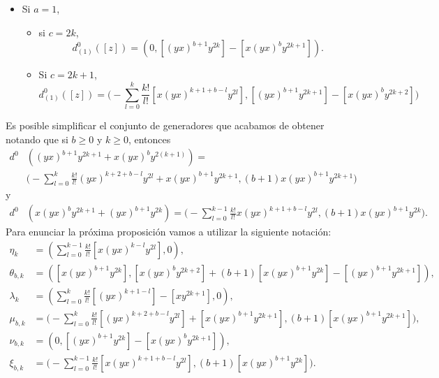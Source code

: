 \documentclass[fleqn,../tesis.tex]{subfiles}
\begin{document}
\begin{itemize}
\begin{itemize}
     \end{itemize}
     \item Si $a = 1$,
     \begin{itemize}
          \item si $c = 2k$,
          \[
               d^{0}_{(1)}([z]) = \left(0, \left[(yx)^{b + 1}y^{2k}\right] - \left[x(yx)^by^{2k + 1}\right] \right).          
          \]
          \item Si $c = 2k + 1$,
          \[
              d^{0}_{(1)}([z]) = \Bigg(-\sum_{l = 0}^{k}\frac{k!}{l!}\left[x(yx)^{k + 1 + b - l}y^{2l}\right],
                  \left[(yx)^{b + 1}y^{2k + 1}\right] - \left[x(yx)^{b}y^{2k + 2}\right]\Bigg)
          \]      
     \end{itemize}
\end{itemize}
Es posible simplificar el conjunto de generadores que acabamos de obtener notando que si $b \geq 0$ y $k \geq 0$, entonces
\begin{align*}
    d^{0}&\left((yx)^{b + 1}y^{2k + 1} + x(yx)^{b}y^{2(k + 1)}\right) = \\
    & \Bigg(-\sum_{l = 0}^{k}\frac{k!}{l!}(yx)^{k + 2 + b - l}y^{2l}
                    + x(yx)^{b + 1}y^{2k + 1}, (b + 1) x(yx)^{b + 1}y^{2k + 1}\Bigg)
\end{align*}
y
\begin{align*}
    d^{0}&\left(x(yx)^by^{2k + 1} + (yx)^{b + 1}y^{2k}\right) = \Bigg(-\sum_{l = 0}^{k - 1}\frac{k!}{l!}x(yx)^{k + 1 + b - l}y^{2l},
                  (b + 1)x(yx)^{b + 1}y^{2k}\Bigg).
\end{align*}
Para enunciar la próxima proposición vamos a utilizar la siguiente notación:
\begin{align*}
    \eta_k &= \left(\sum_{l = 0}^{k - 1}\frac{k!}{l!}\left[x(yx)^{k -l}y^{2l}\right], 0\right),\\
    \theta_{b,k} &= \left(\left[x(yx)^{b + 1}y^{2k}\right], \left[x(yx)^{b}y^{2k + 2}\right] + (b + 1)\left[x(yx)^{b  + 1}y^{2k}\right] 
        - \left[(yx)^{b + 1}y^{2k + 1}\right]\right),\\
    \lambda_{k} &= \left(\sum_{l = 0}^{k}\frac{k!}{l!}\left[(yx)^{k + 1 - l}\right] - \left[xy^{2k + 1}\right], 0\right),\\
    \mu_{b, k} &= \Bigg(-\sum_{l = 0}^{k}\frac{k!}{l!}\left[(yx)^{k + 2 + b - l}y^{2l}\right]
                    + \left[x(yx)^{b + 1}y^{2k + 1}\right], (b + 1) \left[x(yx)^{b + 1}y^{2k + 1}\right]\Bigg),\\
    \nu_{b , k} &=\left(0, \left[(yx)^{b + 1}y^{2k}\right] - \left[x(yx)^{b}y^{2k + 1}\right]\right),\\
    \xi_{b, k} &= \Bigg(-\sum_{l = 0}^{k - 1}\frac{k!}{l!}\left[x(yx)^{k + 1 + b - l}y^{2l}\right],
                  (b + 1)\left[x(yx)^{b + 1}y^{2k}\right]\Bigg).
\end{align*}
\end{document}

